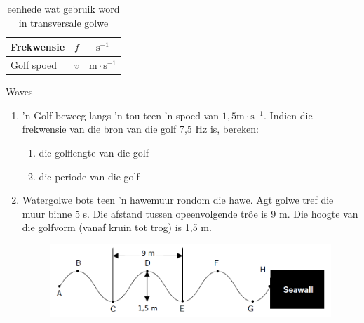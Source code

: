 \begin{definition}
\begin{table}[H]
\begin{center}
\begin{tabular}{|l|c|c|c|}
Frekwensie & $f$ & \multicolumn{2}{c|}{$\text{s}^{-1}$}  \\ \hline
Golf spoed & $v$ & \multicolumn{2}{c|}{$\text{m} \cdot \text{s}^{-1}$} \\ \hline
\end{tabular}
\end{center}
\caption{eenhede wat gebruik word in transversale golwe}
\label{table:electricity::units}
\end{table}
    \begin{eocexercises}{Waves}
            \nopagebreak
\label{m38806*id324367}\begin{enumerate}[noitemsep, label=\textbf{\arabic*}. ] 
\label{m38806*uid128}\item  'n Golf beweeg langs 'n tou teen 'n spoed van $1,5\text{m}\ensuremath{\cdot}\text{s}{}^{-1}$. Indien die frekwensie van die bron van die golf 7,5 Hz is, bereken:
\label{m38806*id324525}\begin{enumerate}[noitemsep, label=\textbf{\alph*}. ] 
            \label{m38806*uid129}\item die golflengte van die golf
\label{m38806*uid130}\item die periode van die golf
\end{enumerate}
                \item Watergolwe bots teen 'n  hawemuur rondom die hawe. Agt golwe tref die muur
           binne 5 s. Die afstand tussen opeenvolgende trôe is 9 m. Die hoogte van
          die golfvorm (vanaf kruin tot trog) is 1,5 m.
    \setcounter{subfigure}{0}
	\begin{figure}[H] %
    \begin{center}
    \label{m38806*id634524!!!underscore!!!media}\label{m38806*id634524!!!underscore!!!printimage}\includegraphics[width=0.8\columnwidth]{col11305.imgs/m38806_seawall.png} %
      \vspace{2pt}
    \vspace{.1in}
    \end{center}
 \end{figure}       
\label{m38806*uid081231}\begin{enumerate}[noitemsep, label=\textbf{\alph*}. ] 

\end{enumerate}
\end{enumerate}
\end{eocexercises}
\end{definition}
